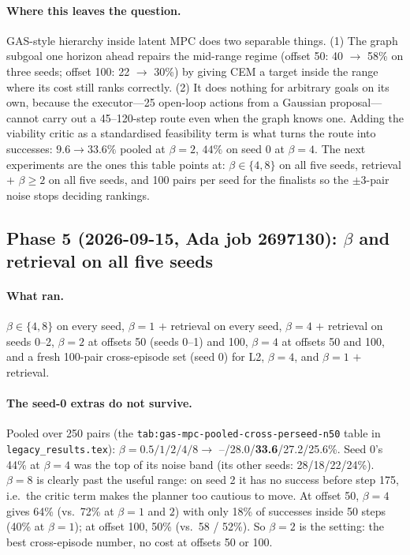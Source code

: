\documentclass[11pt]{article}
\begin{document}
\paragraph{Where this leaves the question.} GAS-style hierarchy inside latent MPC does two
separable things. (1) The graph subgoal one horizon ahead repairs the mid-range regime
(offset 50: 40 $\to$ 58\% on three seeds; offset 100: 22 $\to$ 30\%) by giving CEM a
target inside the range where its cost still ranks correctly. (2) It does nothing for
arbitrary goals on its own, because the executor---25 open-loop actions from a Gaussian
proposal---cannot carry out a 45--120-step route even when the graph knows one. Adding the
viability critic as a standardised feasibility term is what turns the route into
successes: $9.6 \to 33.6\%$ pooled at $\beta=2$, $44\%$ on seed 0 at $\beta=4$. The next
experiments are the ones this table points at: $\beta\in\{4,8\}$ on all five seeds,
retrieval $+$ $\beta\ge 2$ on all five seeds, and 100 pairs per seed for the finalists so
the $\pm$3-pair noise stops deciding rankings.

\subsection{Phase 5 (2026-09-15, Ada job 2697130): $\beta$ and retrieval on all five seeds}
\paragraph{What ran.} $\beta\in\{4,8\}$ on every seed, $\beta=1$ $+$ retrieval on every
seed, $\beta=4$ $+$ retrieval on seeds 0--2, $\beta=2$ at offsets 50 (seeds 0--1) and 100,
$\beta=4$ at offsets 50 and 100, and a fresh 100-pair cross-episode set (seed 0) for L2,
$\beta=4$, and $\beta=1$ $+$ retrieval.

\paragraph{The seed-0 extras do not survive.} Pooled over 250 pairs
(the \texttt{tab:gas-mpc-pooled-cross-perseed-n50} table in \texttt{legacy\_results.tex}): $\beta=0.5/1/2/4/8 \to$ --/28.0/\textbf{33.6}/27.2/25.6\%.
Seed 0's 44\% at $\beta=4$ was the top of its noise band (its other seeds: 28/18/22/24\%).
$\beta=8$ is clearly past the useful range: on seed 2 it has no success before step 175,
i.e.\ the critic term makes the planner too cautious to move. At offset 50, $\beta=4$ gives
64\% (vs.\ 72\% at $\beta=1$ and $2$) with only 18\% of successes inside 50 steps (40\% at
$\beta=1$); at offset 100, 50\% (vs.\ 58 / 52\%). So $\beta=2$ is the setting: the best
cross-episode number, no cost at offsets 50 or 100.
\end{document}
